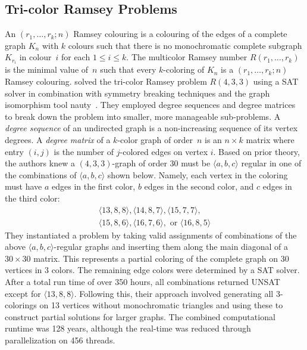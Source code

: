 \subsection{Tri-color Ramsey Problems}

An $(r_1,\dotsc,r_k; n)$ Ramsey colouring is a colouring of the edges of a complete graph $K_n$ with $k$ colours such that there is no monochromatic complete subgraph $K_{r_i}$ in colour~$i$ for each $1\leq i\leq k$.
The multicolor Ramsey number $R(r_1,\dotsc,r_k)$ is the minimal value of~$n$ such that every $k$-coloring of $K_n$ is a $(r_1,\dotsc,r_k; n)$ Ramsey colouring.
 solved the tri-color Ramsey problem $R(4, 3, 3)$ using a SAT solver in combination with symmetry breaking techniques and the graph isomorphism tool nauty~\cite{nauty2014}. 
They employed degree sequences and degree matrices to break down the problem into smaller, more manageable sub-problems. 
A \emph{degree sequence} of an undirected graph is a non-increasing sequence of its vertex degrees. 
A \emph{degree matrix} of a $k$-color graph of order~$n$ is an $n \times k$ matrix where entry $(i,j)$ is the number of $j$-colored edges on vertex $i$.
Based on prior theory, the authors knew a $(4,3,3)$-graph of order 30 must be $\langle a,b,c\rangle$ regular in one of the combinations of $\langle a,b,c\rangle$ shown below. Namely, each vertex in the coloring must have $a$ edges in the first color, $b$ edges in the second color, and $c$
edges in the third color:
\begin{gather*}
\langle 13, 8, 8\rangle,
\langle14, 8, 7\rangle,
\langle15, 7, 7\rangle, \\
\langle15, 8, 6\rangle,
\langle16, 7, 6\rangle,
\text{ or } \langle16, 8, 5\rangle
\end{gather*}
They instantiated a problem by taking valid assignments of combinations of the above $\langle a,b,c\rangle$-regular graphs and inserting them along the main diagonal of a $30 \times 30$ matrix. 
This represents a partial coloring of the complete graph on 30 vertices in 3 colors. 
The remaining edge colors were determined by a SAT solver. After a total run time of over 350 hours, all combinations returned UNSAT except for $\langle13,8,8\rangle$.
Following this, their approach involved generating all 3-colorings on 13 vertices without monochromatic triangles and using these to construct partial solutions for larger graphs. The combined computational runtime was 128 years, although the real-time was reduced through parallelization on 456 threads.

